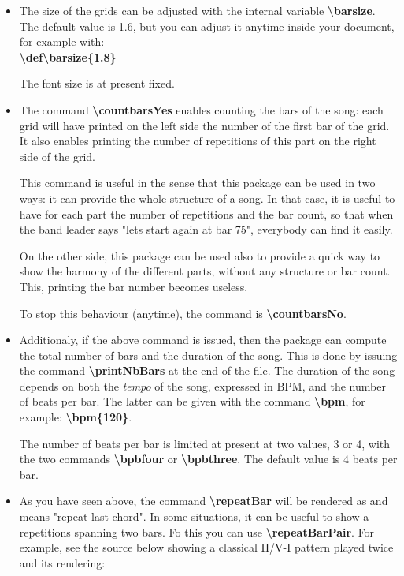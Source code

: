 \documentclass[11pt]{article}
\newcommand{\btt}{\bfseries \ttfamily }
\newcommand{\tbs}{\textbackslash{}}
\begin{document}
\begin{itemize}

\item The size of the grids can be adjusted with the internal variable 
{\btt \tbs barsize}.
The default value is 1.6, but you can adjust it anytime inside your document, for example with:\\
{\btt \tbs def\tbs barsize\{1.8\}}

The font size is at present fixed.

\item The command {\btt \tbs countbarsYes} enables counting the bars of the song:
each grid will have printed on the left side the number of the first bar of the grid.
It also enables printing the number of repetitions of this part on the right side of the grid.

This command is useful in the sense that this package can be used in two ways:
it can provide the whole structure of a song.
In that case, it is useful to have for each part the number of repetitions and the bar count, so that when the band leader says "lets start again at bar 75", everybody can find it easily.

On the other side, this package can be used also to provide a quick way to show the harmony of the different parts, without any structure or bar count.
This, printing the bar number becomes useless.

To stop this behaviour (anytime), the command is {\btt \tbs countbarsNo}.

\item Additionaly, if the above command is issued, then the package can compute the total number of bars and the duration of the song.
This is done by issuing the command {\btt \tbs printNbBars} at the end of the file.
The duration of the song depends on both the {\em tempo} of the song, expressed in BPM, and the number of beats per bar.
The latter can be given with the command {\btt \tbs bpm}, for example:
{\btt \tbs bpm\{120\}}.

The number of beats per bar is limited at present at two values, 3 or 4, with the two commands
{\btt \tbs bpbfour} or {\btt \tbs bpbthree}.
The default value is 4 beats per bar.

\item As you have seen above, the command {\btt \tbs repeatBar} will be rendered as \textdiscount{} and means "repeat last chord".
In some situations, it can be useful to show a repetitions spanning two bars.
Fo this you can use {\btt \tbs repeatBarPair}.
For example, see the source below showing a classical II/V-I pattern played twice and its rendering:


\end{itemize}
\end{document}
